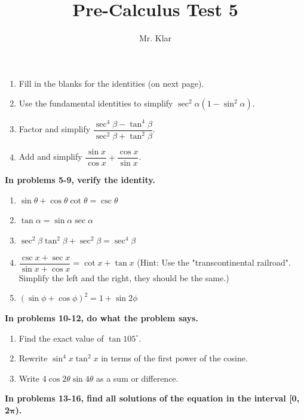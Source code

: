 \documentclass[letterpaper]{article}
\title{Pre-Calculus \linebreak
Test 5}
\author{Mr. Klar}
\date{}
\begin{document}

\maketitle

\begin{enumerate}
	\item Fill in the blanks for the identities (on next page). 
	\item Use the fundamental identities to simplify $\sec^2\alpha(1-\sin^2\alpha)$. 
\item Factor and simplify $\dfrac{\sec^4\beta-\tan^4\beta}{\sec^2\beta+\tan^2\beta}$.
\item Add and simplify $\dfrac{\sin x}{\cos x}+\dfrac{\cos x}{\sin x}$.
\end{enumerate}
\noindent	\textbf{In problems 5-9, verify the identity.}
\begin{enumerate}[resume]
\item $\sin\theta +\cos\theta\cot\theta = \csc\theta$
\item $\tan\alpha = \sin\alpha\sec\alpha$
\item $\sec^2\beta\tan^2\beta+\sec^2\beta = \sec^4 \beta	$
\item $\dfrac{\csc x + \sec x}{\sin x + \cos x} = \cot x + \tan x$ (Hint: Use the "transcontinental railroad". Simplify the left and the right, they should be the same.) 
\item $(\sin\phi + \cos\phi)^2=1+\sin2\phi$

\end{enumerate}
\noindent	\textbf{In problems 10-12, do what the problem says.}
\begin{enumerate}[resume]

\item Find the exact value of $\tan 105^\circ$.
\item Rewrite $\sin^4x\tan^2x$ in terms of the first power of the cosine. 
\item Write $4\cos2\theta\sin4\theta$ as a sum or difference. 

\end{enumerate}
\noindent	\textbf{In problems 13-16, find all solutions of the equation in the interval [0, 2$\bm{\pi}$).}
\end{document}
